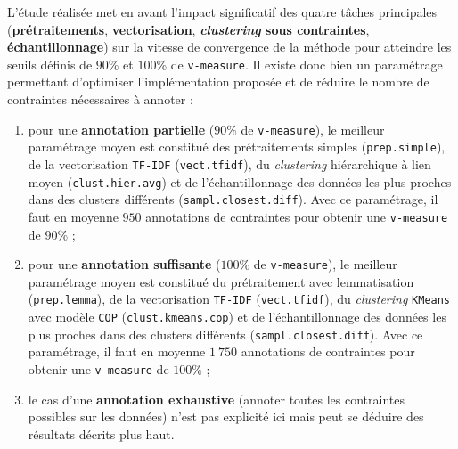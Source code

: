 			L'étude réalisée met en avant l'impact significatif des quatre tâches principales (\textbf{prétraitements}, \textbf{vectorisation}, \textbf{\textit{clustering} sous contraintes}, \textbf{échantillonnage}) sur la vitesse de convergence de la méthode pour atteindre les seuils définis de $90$\% et $100$\% de \texttt{v-measure}. Il existe donc bien un paramétrage permettant d'optimiser l'implémentation proposée et de réduire le nombre de contraintes nécessaires à annoter :
			\begin{enumerate}
				\item pour une \textbf{annotation partielle} ($90$\% de \texttt{v-measure}), le meilleur paramétrage moyen est constitué des prétraitements simples (\texttt{prep.simple}), de la vectorisation \texttt{TF-IDF} (\texttt{vect.tfidf}), du \textit{clustering} hiérarchique à lien moyen (\texttt{clust.hier.avg}) et de l'échantillonnage des données les plus proches dans des clusters différents (\texttt{sampl.closest.diff}).
				Avec ce paramétrage, il faut en moyenne $950$ annotations de contraintes pour obtenir une \texttt{v-measure} de $90$\% ;
				\item pour une \textbf{annotation suffisante} ($100$\% de \texttt{v-measure}), le meilleur paramétrage moyen est constitué du prétraitement avec lemmatisation (\texttt{prep.lemma}), de la vectorisation \texttt{TF-IDF} (\texttt{vect.tfidf}), du \textit{clustering} \texttt{KMeans} avec modèle \texttt{COP} (\texttt{clust.kmeans.cop}) et de l'échantillonnage des données les plus proches dans des clusters différents (\texttt{sampl.closest.diff}).
				Avec ce paramétrage, il faut en moyenne $1~750$ annotations de contraintes pour obtenir une \texttt{v-measure} de $100$\% ;
				\item le cas d'une \textbf{annotation exhaustive} (annoter toutes les contraintes possibles sur les données) n'est pas explicité ici mais peut se déduire des résultats décrits plus haut.
			\end{enumerate}
